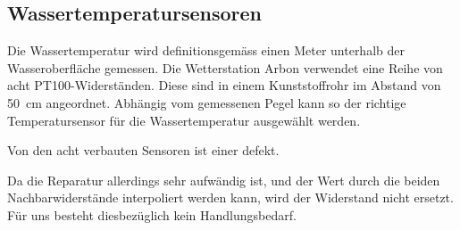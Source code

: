 \subsection{Wassertemperatursensoren}
Die Wassertemperatur wird definitionsgemäss einen Meter unterhalb der Wasseroberfläche gemessen. Die Wetterstation Arbon verwendet eine Reihe von acht PT100-Widerständen. Diese sind in einem Kunststoffrohr im Abstand von 50~cm angeordnet. Abhängig vom gemessenen Pegel kann so der richtige Temperatursensor für die Wassertemperatur ausgewählt werden. 
\newline

\noindent
Von den acht verbauten Sensoren ist einer defekt. 
\newline

\noindent
Da die Reparatur allerdings sehr aufwändig ist, und der Wert durch die beiden Nachbarwiderstände interpoliert werden kann, wird der Widerstand nicht ersetzt. Für uns besteht diesbezüglich kein Handlungsbedarf.













